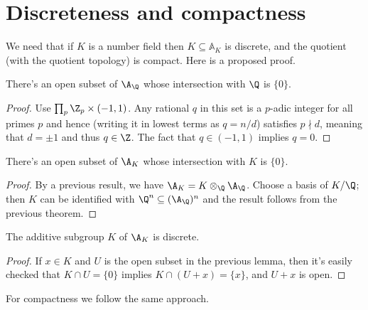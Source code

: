 \section{Discreteness and compactness}

We need that if $K$ is a number field then
$K\subseteq\mathbb{A}_K$ is discrete, and the quotient (with the
quotient topology) is compact. Here is a proposed proof.

\begin{theorem}
  \label{Rat.AdeleRing.zero_discrete}
  \leanok
  There's an open subset of $\A_{\Q}$ whose intersection with $\Q$ is $\{0\}$.
\end{theorem}
\begin{proof}
  Use $\prod_p{\Z_p}\times(-1,1)$. Any rational $q$ in this set is a $p$-adic
  integer for all primes $p$ and hence (writing it in lowest terms as $q=n/d$)
  satisfies $p\nmid d$, meaning that $d=\pm1$ and thus $q\in\Z$. The fact
  that $q\in(-1,1)$ implies $q=0$.
\end{proof}

\begin{theorem}
  \label{NumberField.AdeleRing.zero_discrete}
  \leanok
  There's an open subset of $\A_{K}$ whose intersection with $K$ is $\{0\}$.
\end{theorem}
\begin{proof}
  By a previous result, we have $\A_K=K\otimes_{\Q}\A_{\Q}$.
  Choose a basis of $K/\Q$; then $K$ can be identified with $\Q^n\subseteq(\A_{\Q})^n$
  and the result follows from the previous theorem.
\end{proof}

\begin{theorem}
  \label{NumberField.AdeleRing.discrete}
  \leanok
  The additive subgroup $K$ of $\A_K$ is discrete.
\end{theorem}
\begin{proof}
  If $x\in K$ and $U$ is the open subset in the previous lemma, then
  it's easily checked that $K\cap U=\{0\}$ implies $K\cap (U+x)=\{x\}$,
  and $U+x$ is open.
\end{proof}

For compactness we follow the same approach.

